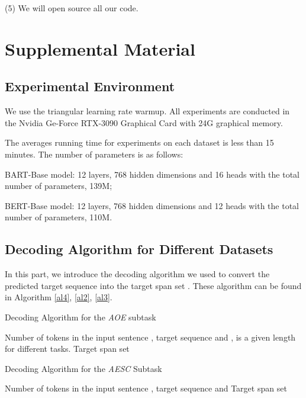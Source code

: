 \documentclass[11pt,a4paper]{article}
\begin{document}
(5) We will open source all our code.







\clearpage
\appendix
\section{Supplemental Material}

\subsection{Experimental Environment} \label{supply:random_search}


We use the triangular learning rate warmup. All experiments are conducted in the Nvidia Ge-Force RTX-3090 Graphical Card with 24G graphical memory. 

The averages running time for experiments on each dataset is less than 15 minutes. The number of parameters is as follows:

 BART-Base model: 12 layers, 768 hidden dimensions and 16 heads with the total number of parameters, 139M;

 BERT-Base model: 12 layers, 768 hidden dimensions and 12 heads with the total number of parameters, 110M.





\subsection{Decoding Algorithm for Different Datasets}
In this part, we introduce the decoding algorithm we used to convert the predicted target sequence  into the target span set .  These algorithm can be found in Algorithm \ref{al4}, \ref{al2}, \ref{al3}.

\begin{algorithm}[!h]
  \begin{algorithmic}[1]
    \caption{Decoding Algorithm for the \emph{AOE} subtask} \label{al4}
    \Require Number of tokens in the input sentence , target sequence  and ,  is a given length for different tasks.
    \Ensure  Target span set 
    \State 
    \While{}
      \State 
      \State 
      \State 
    \EndWhile
    \State 
    \State \Return{}
  \end{algorithmic}  
\end{algorithm}

\begin{algorithm}[!h]
  \begin{algorithmic}[1]
    \caption{Decoding Algorithm for the \emph{AESC} Subtask} \label{al2}
    \Require Number of tokens in the input sentence , target sequence  and 
    \Ensure  Target span set 
    \State  
    \While{}
      \State 
      \If{}
      \State  
      \State 
      \Else
      \State 
      \EndIf
      \State 
    \EndWhile
    \State \Return{}
  \end{algorithmic}  
\end{algorithm}
\end{document}

